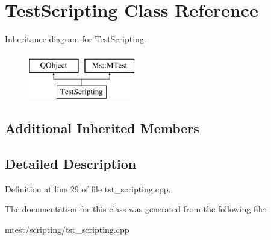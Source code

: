 \hypertarget{class_test_scripting}{}\section{Test\+Scripting Class Reference}
\label{class_test_scripting}
Inheritance diagram for Test\+Scripting\+:\begin{figure}[H]
\begin{center}
\leavevmode
\includegraphics[height=2.000000cm]{class_test_scripting}
\end{center}
\end{figure}
\subsection*{Additional Inherited Members}


\subsection{Detailed Description}


Definition at line 29 of file tst\+\_\+scripting.\+cpp.



The documentation for this class was generated from the following file\+:\begin{DoxyCompactItemize}
\item 
mtest/scripting/tst\+\_\+scripting.\+cpp\end{DoxyCompactItemize}
